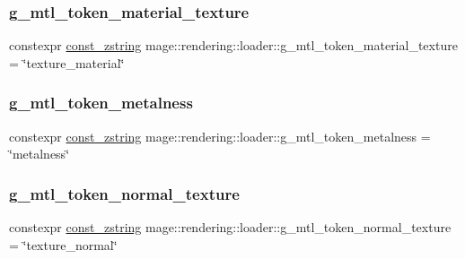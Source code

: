 \hypertarget{namespacemage_1_1rendering_1_1loader_a0bd068f0f246c00b56412b1bd7f70ed4}{}\label{namespacemage_1_1rendering_1_1loader_a0bd068f0f246c00b56412b1bd7f70ed4} 
\subsubsection{\texorpdfstring{g\+\_\+mtl\+\_\+token\+\_\+material\+\_\+texture}{g\_mtl\_token\_material\_texture}}
{\footnotesize\ttfamily constexpr \hyperlink{namespacemage_abfd9206dc607ceb5d13ec68bf075a5c0}{const\+\_\+zstring} mage\+::rendering\+::loader\+::g\+\_\+mtl\+\_\+token\+\_\+material\+\_\+texture = \char`\"{}texture\+\_\+material\char`\"{}}

\hypertarget{namespacemage_1_1rendering_1_1loader_a17bfd9071437318629c792d38ca71808}{}\label{namespacemage_1_1rendering_1_1loader_a17bfd9071437318629c792d38ca71808} 
\subsubsection{\texorpdfstring{g\+\_\+mtl\+\_\+token\+\_\+metalness}{g\_mtl\_token\_metalness}}
{\footnotesize\ttfamily constexpr \hyperlink{namespacemage_abfd9206dc607ceb5d13ec68bf075a5c0}{const\+\_\+zstring} mage\+::rendering\+::loader\+::g\+\_\+mtl\+\_\+token\+\_\+metalness = \char`\"{}metalness\char`\"{}}

\hypertarget{namespacemage_1_1rendering_1_1loader_afa917f0393f16f0fec40ad5d85aa65f9}{}\label{namespacemage_1_1rendering_1_1loader_afa917f0393f16f0fec40ad5d85aa65f9} 
\subsubsection{\texorpdfstring{g\+\_\+mtl\+\_\+token\+\_\+normal\+\_\+texture}{g\_mtl\_token\_normal\_texture}}
{\footnotesize\ttfamily constexpr \hyperlink{namespacemage_abfd9206dc607ceb5d13ec68bf075a5c0}{const\+\_\+zstring} mage\+::rendering\+::loader\+::g\+\_\+mtl\+\_\+token\+\_\+normal\+\_\+texture = \char`\"{}texture\+\_\+normal\char`\"{}}


